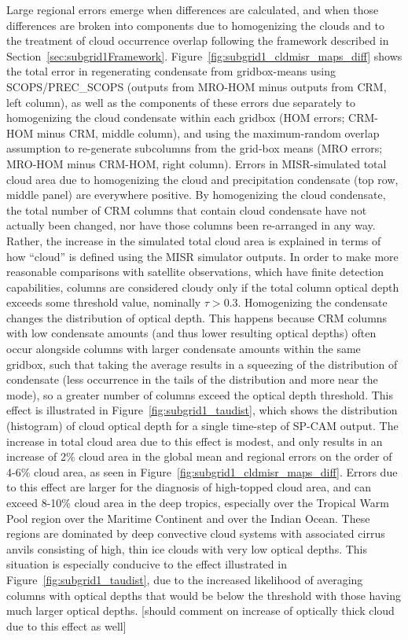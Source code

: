 Large regional errors emerge when differences are calculated, and when
those differences are broken into components due to homogenizing the
clouds and to the treatment of cloud occurrence overlap following the
framework described in Section~\ref{sec:subgrid1Framework}.
Figure~\ref{fig:subgrid1_cldmisr_maps_diff} shows the total error in
regenerating condensate from gridbox-means using SCOPS/PREC\_SCOPS
(outputs from MRO-HOM minus outputs from CRM, left column), as well as
the components of these errors due separately to homogenizing the cloud
condensate within each gridbox (HOM errors; CRM-HOM minus CRM, middle
column), and using the maximum-random overlap assumption to re-generate
subcolumns from the grid-box means (MRO errors; MRO-HOM minus CRM-HOM,
right column). Errors in MISR-simulated total cloud area due to
homogenizing the cloud and precipitation condensate (top row, middle
panel) are everywhere positive. By homogenizing the cloud condensate,
the total number of CRM columns that contain cloud condensate have not
actually been changed, nor have those columns been re-arranged in any
way. Rather, the increase in the simulated total cloud area is explained
in terms of how ``cloud'' is defined using the MISR simulator outputs.
In order to make more reasonable comparisons with satellite
observations, which have finite detection capabilities, columns are
considered cloudy only if the total column optical depth exceeds some
threshold value, nominally \(\tau > 0.3\). Homogenizing the condensate
changes the distribution of optical depth. This happens because CRM
columns with low condensate amounts (and thus lower resulting optical
depths) often occur alongside columns with larger condensate amounts
within the same gridbox, such that taking the average results in a
squeezing of the distribution of condensate (less occurrence in the
tails of the distribution and more near the mode), so a greater number
of columns exceed the optical depth threshold. This effect is
illustrated in Figure~\ref{fig:subgrid1_taudist}, which shows the
distribution (histogram) of cloud optical depth for a single time-step
of SP-CAM output. The increase in total cloud area due to this effect is
modest, and only results in an increase of 2\% cloud area in the global
mean and regional errors on the order of 4-6\% cloud area, as seen in
Figure~\ref{fig:subgrid1_cldmisr_maps_diff}. Errors due to this effect
are larger for the diagnosis of high-topped cloud area, and can exceed
8-10\% cloud area in the deep tropics, especially over the Tropical Warm
Pool region over the Maritime Continent and over the Indian Ocean. These
regions are dominated by deep convective cloud systems with associated
cirrus anvils consisting of high, thin ice clouds with very low optical
depths. This situation is especially conducive to the effect illustrated
in Figure~\ref{fig:subgrid1_taudist}, due to the increased likelihood of
averaging columns with optical depths that would be below the threshold
with those having much larger optical depths. {[}should comment on
increase of optically thick cloud due to this effect as well{]}

